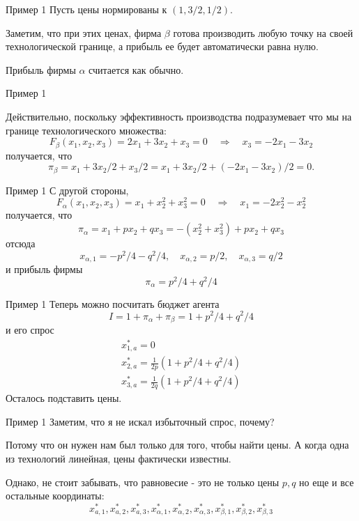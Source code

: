 \documentclass{beamer}
\begin{document}
\begin{frame}{Пример 1}
Пусть цены нормированы к $(1, 3/2, 1/2)$.

Заметим, что при этих ценах, фирма $\beta$ готова производить любую точку на своей технологической границе, а прибыль ее будет автоматически равна нулю.

Прибыль фирмы $\alpha$ считается как обычно.

\end{frame}

\begin{frame}{Пример 1}

Действительно, поскольку эффективность производства подразумевает что мы на границе технологического множества:
$$F_{\beta}(x_1, x_2, x_3) = 2 x_1 + 3 x_2 + x_3 = 0 \quad \Rightarrow \quad x_3 = -2 x_1 - 3 x_2$$
получается, что
$$\pi_{\beta} = x_1 + 3 x_2/2 + x_3/2 = x_1 + 3 x_2/2 + (-2 x_1 - 3 x_2)/2 = 0.$$
\end{frame}

\begin{frame}{Пример 1}
С другой стороны,
$$F_{\alpha}(x_1, x_2, x_3) = x_1 + x^2_2 + x^2_3 = 0 \quad \Rightarrow \quad x_1 = -2 x^2_2 - x^2_2$$
получается, что
$$ \pi_{\alpha} = x_1 + p x_2 + q x_3 = - (x^2_2 + x^2_3) + p x_2 + q x_3 $$
отсюда
$$ x_{\alpha, 1} = -p^2/4 - q^2/4, \quad x_{\alpha, 2} = p/2, \quad x_{\alpha, 3} = q/2$$
и прибыль фирмы
$$ \pi_{\alpha} = p^2/4 + q^2/4$$
\end{frame}

\begin{frame}{Пример 1}
Теперь можно посчитать бюджет агента
$$ I = 1 + \pi_{\alpha} + \pi_{\beta} = 1 + p^2/4 + q^2/4$$
и его спрос
\begin{gather*}
	x^*_{1,a} = 0\\
	x^*_{2,a} = \frac{1}{2p}(1 + p^2/4 + q^2/4)\\
	x^*_{3,a} = \frac{1}{2q}(1 + p^2/4 + q^2/4)
\end{gather*}
Осталось подставить цены.
\end{frame}

\begin{frame}{Пример 1}
Заметим, что я не искал избыточный спрос, почему?

Потому что он нужен нам был только для того, чтобы найти цены. А когда одна из технологий линейная, цены фактически известны.

Однако, не стоит забывать, что равновесие - это не только цены $p,q$ но еще и все остальные координаты: $$x^{\ast}_{a, 1}, x^{\ast}_{a, 2}, x^{\ast}_{a, 3}, x^{\ast}_{\alpha, 1},x^{\ast}_{\alpha, 2},x^{\ast}_{\alpha, 3}, x^{\ast}_{\beta, 1},x^{\ast}_{\beta, 2},x^{\ast}_{\beta, 3}$$
\end{frame}
\end{document}
